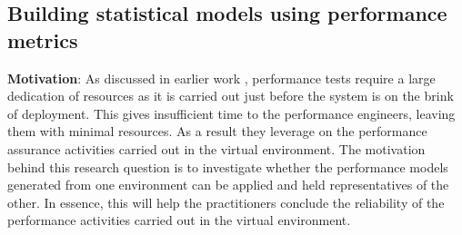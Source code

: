\begin{table}[tbh]
	\centering
	\caption{CloudStore: Top 10 highly correlated metrics with load (Virtual Server)}
	\label{my-label}
\end{table}


\subsection{Building statistical models using performance metrics}

\textbf{Motivation}: As discussed in earlier work \cite{Shang:2015:ADP:2668930.2688052} \cite{Nguyen:2012:ADP:2188286.2188344}, performance tests require a large dedication of resources as it is carried out just before the system is on the brink of deployment. This gives insufficient time to the performance engineers, leaving them with minimal resources. As a result they leverage on the performance assurance activities carried out in the virtual environment. The motivation behind this research question is to investigate whether the performance models generated from one environment can be applied and held representatives of the other. In essence, this will help the practitioners conclude the reliability of the performance activities carried out in the virtual environment. 

